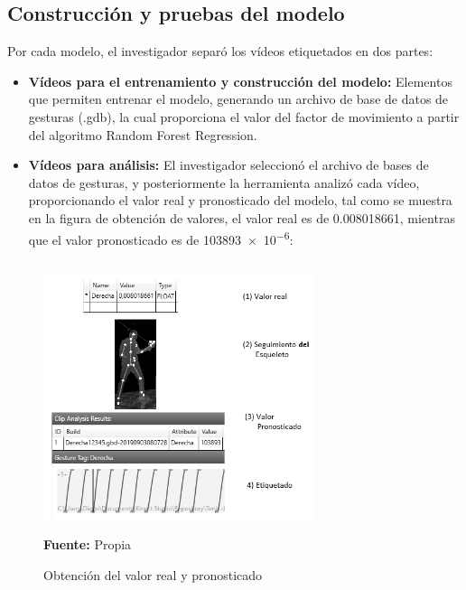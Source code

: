 \subsection{Construcci\'on y pruebas del modelo}
Por cada modelo, el investigador separ\'o los v\'ideos etiquetados en dos partes:
\begin{itemize}
\item \textbf{V\'ideos para el entrenamiento y construcci\'on del modelo:} Elementos que permiten  entrenar el modelo, generando un archivo de base de datos de gesturas (.gdb), la cual proporciona el valor del factor de movimiento a partir del algoritmo Random Forest Regression.
\item \textbf{V\'ideos para an\'alisis:} El investigador seleccion\'o el archivo de bases de datos de gesturas, y posteriormente la herramienta analiz\'o cada v\'ideo, proporcionando el valor real y pronosticado del modelo, tal como se muestra en la figura de obtenci\'on de valores, el valor real es de 0.008018661, mientras que el valor pronosticado es de \num{103893e-6}:
\end{itemize}
 \begin{figure}[H]
	\caption{Obtenci\'on del valor real y pronosticado}
	\label{fig:getError}
	\centering
	\includegraphics[width=300px,height=300px]{graphics/getError.png} \\
	\textbf{Fuente:} Propia
\end{figure} 
